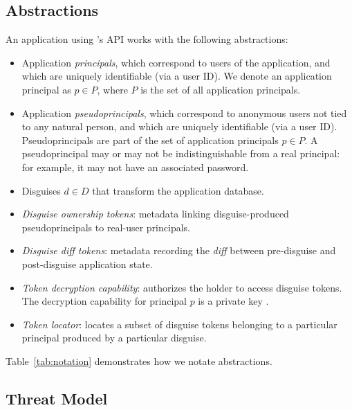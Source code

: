 \subsection{\sys Abstractions}
An application using \sys's API works with the following \sys abstractions:
\begin{itemize}
    \item Application \emph{principals}, which correspond to users of the application, 
	and which are uniquely identifiable (\eg via a user ID).
	We denote an application principal as $p \in P$, where $P$ is the set of all application principals.
    \item Application \emph{pseudoprincipals}, which correspond to anonymous users not tied to any natural
    person, and which are uniquely identifiable (\eg via a user ID).
	Pseudoprincipals are part of the set of application principals $p \in P$.
    A pseudoprincipal may or may not be indistinguishable from a real principal: for example, it 
        may not have an associated password.
    \item Disguises $d \in D$ %
        that transform the application database.
    \item \emph{Disguise ownership tokens}: metadata linking
        disguise-produced pseudoprincipals to real-user principals.
    \item \emph{Disguise diff tokens}: metadata recording the \emph{diff} between pre-disguise and
        post-disguise application state.
    \item \emph{Token decryption capability}: authorizes the holder to access disguise tokens. 
        The decryption capability for principal $p$ is a private key .
    \item \emph{Token locator}: locates a subset of disguise tokens belonging to a particular
        principal produced by a particular disguise.
\end{itemize}
Table~\ref{tab:notation} demonstrates how we notate abstractions.

\subsection{Threat Model}
\label{s:threat}


